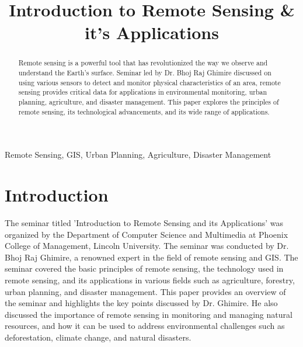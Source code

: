 \documentclass[conference]{IEEEtran}
\begin{document}
\title{Introduction to Remote Sensing \& it's Applications}

\author{
}

\maketitle

\begin{abstract}
    Remote sensing is a powerful tool that has revolutionized the way we observe and understand the Earth's surface. Seminar led by Dr. Bhoj Raj Ghimire discussed on using various sensors to detect and monitor physical characteristics of an area, remote sensing provides critical data for applications in environmental monitoring, urban planning, agriculture, and disaster management. This paper explores the principles of remote sensing, its technological advancements, and its wide range of applications.
\end{abstract}

\begin{IEEEkeywords}
    Remote Sensing, GIS, Urban Planning, Agriculture, Disaster Management
\end{IEEEkeywords}

\section{Introduction}
The seminar titled 'Introduction to Remote Sensing and its Applications' was organized by the Department of Computer Science and Multimedia at Phoenix College of Management, Lincoln University. The seminar was conducted by Dr. Bhoj Raj Ghimire, a renowned expert in the field of remote sensing and GIS. The seminar covered the basic principles of remote sensing, the technology used in remote sensing, and its applications in various fields such as agriculture, forestry, urban planning, and disaster management. This paper provides an overview of the seminar and highlights the key points discussed by Dr. Ghimire. He also discussed the importance of remote sensing in monitoring and managing natural resources, and how it can be used to address environmental challenges such as deforestation, climate change, and natural disasters.
\end{document}
